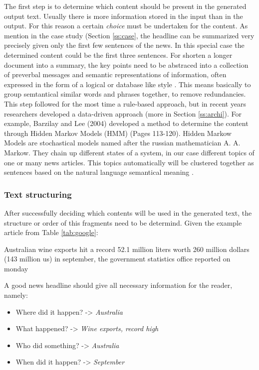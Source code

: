 The first step is to determine which content should be present in the generated output text. Usually there is more information stored in the input than in the output. For this reason a certain \textit{choice} must be undertaken for the content. As mention in the case study (Section \ref{ss:case}, the headline can be summarized very precisely given only the first few sentences of the news. In this special case the determined content could be the first three sentences. For shorten a longer document into a summary, the key points need to be abstraced into a collection of preverbal messages and semantic representations of information, often expressed in the form of a logical or database like style \cite{gatt}. This means basically to group semtantical similar words and phrases together, to remove redundancies. This step followed for the most time a rule-based approach, but in recent years researchers developed a data-driven approach (more in Section \ref{ss:archi}). For example, Barzilay and Lee (2004) developed a method to determine the content through Hidden Markov Models (HMM) \cite{lee} (Pages 113-120). Hidden Markow Models are stochastical models named after the russian mathematician A. A. Markow. They chain up different states of a system, in our case different topics of one or many news articles. This topics automatically will be clustered together as sentences based on the natural language semantical meaning \cite{gatt}. 

\subsubsection{Text structuring}

After successfully deciding which contents will be used in the generated text, the structure or order of this fragments need to be determind. Given the example article from Table \ref{tab:google}:

\begin{tcolorbox}
\begin{center}
		Australian wine exports hit a record 52.1 million liters worth 260 million dollars (143 million us) in september, the government statistics office reported on monday 
\end{center}
\end{tcolorbox}

A good news headline should give all necessary information for the reader, namely:

\begin{itemize}
	\item Where did it happen? -> \textit{Australia}
	\item What happened? -> \textit{Wine exports, record high}
	\item Who did something? -> \textit{Australia}
	\item When did it happen? -> \textit{September}
\end{itemize}

